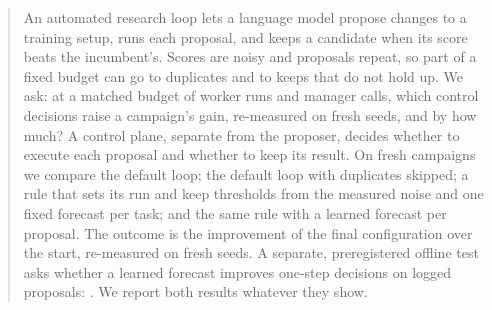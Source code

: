 \begin{abstract}
An automated research loop lets a language model propose changes to a training setup, runs each proposal, and keeps a candidate when its score beats the incumbent's. Scores are noisy and proposals repeat, so part of a fixed budget can go to duplicates and to keeps that do not hold up. We ask: at a matched budget of worker runs and manager calls, which control decisions raise a campaign's gain, re-measured on fresh seeds, and by how much? A control plane, separate from the proposer, decides whether to execute each proposal and whether to keep its result. On fresh campaigns we compare the default loop; the default loop with duplicates skipped; a rule that sets its run and keep thresholds from the measured noise and one fixed forecast per task; and the same rule with a learned forecast per proposal. The outcome is the improvement of the final configuration over the start, re-measured on fresh seeds. \LoopHeadline{} A separate, preregistered offline test asks whether a learned forecast improves one-step decisions on logged proposals: \GateVerdict. We report both results whatever they show. 
\end{abstract}
